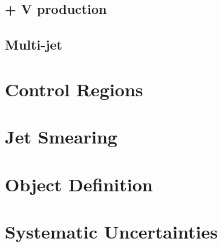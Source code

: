 \subsection{\ttbar + V production}

\subsection{Multi-jet}

\section{Control Regions}
\label{sec:analyses:cr}

\section{Jet Smearing}

\section{Object Definition}

\section{Systematic Uncertainties}